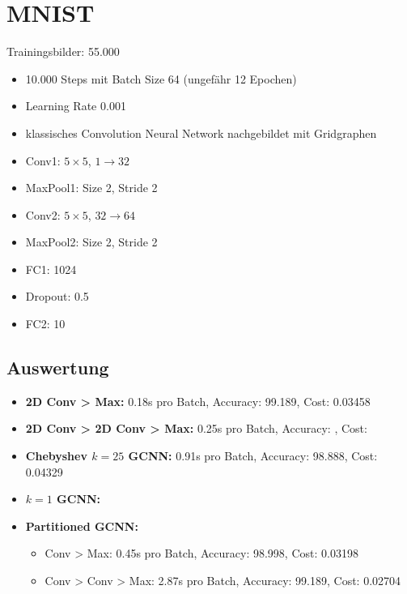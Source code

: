 \section{MNIST}

Trainingsbilder: 55.000

\begin{itemize}
  \item 10.000 Steps mit Batch Size 64 (ungefähr 12 Epochen)
  \item Learning Rate 0.001
  \item klassisches Convolution Neural Network nachgebildet mit Gridgraphen
  \item Conv1: $5 \times 5$, $1 \rightarrow 32$
  \item MaxPool1: Size 2, Stride 2
  \item Conv2: $5 \times 5$, $32 \rightarrow 64$
  \item MaxPool2: Size 2, Stride 2
  \item FC1: 1024
  \item Dropout: 0.5
  \item FC2: 10
\end{itemize}

\subsection{Auswertung}

\begin{itemize}
  \item \textbf{2D Conv > Max:} 0.18s pro Batch, Accuracy: 99.189, Cost: 0.03458
  \item \textbf{2D Conv > 2D Conv > Max:} 0.25s pro Batch, Accuracy: , Cost:
  \item \textbf{Chebyshev $k=25$ GCNN:} 0.91s pro Batch, Accuracy: 98.888, Cost: 0.04329
  \item \textbf{$k=1$ GCNN:}
  \item \textbf{Partitioned GCNN:}
  \begin{itemize}
    \item Conv > Max: 0.45s pro Batch, Accuracy: 98.998, Cost: 0.03198
    \item Conv > Conv > Max: 2.87s pro Batch, Accuracy: 99.189, Cost: 0.02704
  \end{itemize}
\end{itemize}
